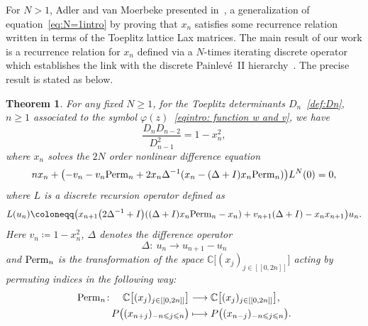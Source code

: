 \documentclass[pdftex]{sigma}%
\numberwithin{equation}{section}
\newtheorem{Theorem}{Theorem}[section]
\newcommand{\C}{\mathbb{C}}
\begin{document}
For $N > 1$, Adler and van Moerbeke presented in~\cite{AV}, a generalization of equation~\eqref{eq:N=1intro} by proving that $x_n$ satisfies some recurrence relation written in terms of the Toeplitz lattice Lax matrices. The main result of our work is a recurrence relation for $x_n$ defined via a $N$-times iterating discrete operator which establishes the link with the discrete Painlev\'e~II hierarchy~\cite{joshi1999discrete}.
The precise result is stated as below.
\begin{Theorem}
	\label{thm:main intro}
For any fixed $N\geq 1$, for the Toeplitz determinants $D_n$~\eqref{def:Dn}, $n\geq 1$ associated to the symbol $\varphi(z)$~\eqref{eqintro: function w and v}, we have
\begin{equation}
\label{eq:Ngenintro}
\frac{D_{n}D_{n-2}}{D_{n-1}^2} = 1-x_n^2,
\end{equation}
where $x_n $ solves the $2N$ order nonlinear difference equation
\begin{equation}
\label{eq:dPIIhierarchy intro}
nx_n+\bigl(-v_n-v_n{\rm Perm}_n+2x_n\Delta^{-1}(x_n-(\Delta+I)x_{n}{\rm Perm}_n)\bigr){L}^N(0)=0,
\end{equation}
where $L$ is a discrete recursion operator defined as
\begin{equation}
\label{eq:recop intro}
L(u_n)\coloneqq \big(x_{n+1}\big(2\Delta^{-1}+I\big)((\Delta+I)x_{n}{\rm Perm}_n-x_n) +v_{n+1}(\Delta+I)-x_nx_{n+1}\bigr)u_n.
\end{equation}
Here $v_n\coloneqq 1-x_n^2$, $\Delta$ denotes the difference operator
\begin{equation*}
\Delta\colon\ u_n\to u_{n+1}-u_n
\end{equation*}
and ${\rm Perm}_n$
is the transformation of the space $\C\big[(x_j)_{j\in[[0,2n]]}\big]$ acting by permuting indices in the following way:
\begin{align}\label{eq:Permdef intro}
\begin{split}
{\rm Perm}_n\colon\quad \C\big[(x_j)_{j\in[[0,2n]]}\big]&\longrightarrow\C\big[(x_j)_{j\in[[0,2n]]}\big],
\\
P\big((x_{n+j})_{-n\leqslant j\leqslant n}\big)&\longmapsto P\big((x_{n-j})_{-n\leqslant j\leqslant n}\big).
\end{split}
\end{align}
\end{Theorem}
\end{document}
